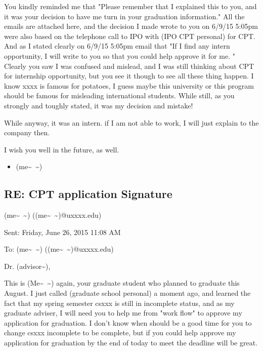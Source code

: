 \documentclass[9pt,b5paper]{article}
\begin{document}
You kindly reminded me that "Please remember that I explained this to you, and it was your decision to have me turn in your graduation information." All the emails are attached here, and the decision I made wrote to you on 6/9/15 5:05pm were also based on the telephone call to IPO with (IPO CPT personal) for CPT. And as I stated clearly on 6/9/15 5:05pm email that "If I find any intern opportunity, I will write to you so that you could help approve it for me. " Clearly you saw I was confused and mislead, and I was still thinking about CPT for internship opportunity, but you see it though to see all these thing happen. I know xxxx is famous for potatoes, I guess maybe this university or this program should be famous for misleading international students. While still, as you strongly and toughly stated, it was my decision and mistake!

While anyway, it was an intern. if I am not able to work, I will just explain to the company then. 

I wish you well in the future, as well. 

\begin{itemize}
\item (me\textasciitilde{}~\textasciitilde{})
\end{itemize}

\subsection{RE: CPT application Signature}
\label{sec-7-9}

(me\textasciitilde{}~\textasciitilde{}) ((me\textasciitilde{}~\textasciitilde{})@uxxxx.edu)

Sent:        Friday, June 26, 2015 11:08 AM

To:        
(me\textasciitilde{}~\textasciitilde{}) ((me\textasciitilde{}~\textasciitilde{})@uxxxx.edu)

Dr. (advisor\textasciitilde{}), 

This is (Me\textasciitilde{}~\textasciitilde{}) again, your graduate student who planned to graduate this August. I just called (graduate school personal) a moment ago, and learned the fact that my spring semester csxxx is still in incomplete status, and as my graduate adviser, I will need you to help me from "work flow" to approve my application for graduation. I don't know when should be a good time for you to change csxxx incomplete to be complete, but if you could help approve my application for graduation by the end of today to meet the deadline will be great. 
\end{document}
